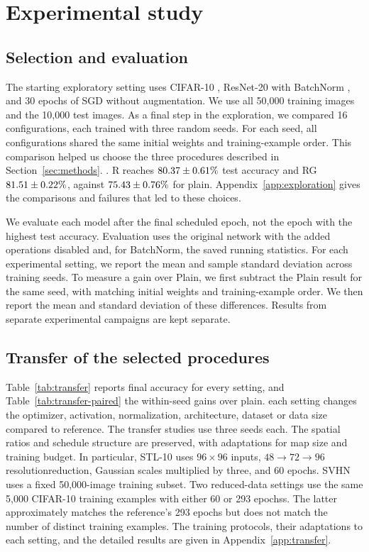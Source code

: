 \section{Experimental study}
\label{sec:experiments}
\subsection{Selection and evaluation}
The starting exploratory setting uses CIFAR-10 \citep{krizhevsky2009learning}, ResNet-20 \citep{he2016resnet} with BatchNorm \citep{ioffe2015batch}, and 30 epochs of SGD without augmentation. We use all 50,000 training images and the 10,000 test images. As a final step in the exploration, we compared 16 configurations, each trained with three random seeds. For each seed, all configurations shared the same initial weights and training-example order. This comparison helped us choose the three procedures described in Section~\ref{sec:methods}.
. R reaches $80.37\pm0.61\%$ test accuracy and RG $81.51\pm0.22\%$, against $75.43\pm0.76\%$ for plain. Appendix~\ref{app:exploration} gives the comparisons and failures that led to these choices.

We evaluate each model after the final scheduled epoch, not the epoch with the highest test accuracy. Evaluation uses the original network with the added operations disabled and, for BatchNorm, the saved running statistics. For each experimental setting, we report the mean and sample standard deviation across training seeds. To measure a gain over Plain, we first subtract the Plain result for the same seed, with matching initial weights and training-example order. We then report the mean and standard deviation of these differences. Results from separate experimental campaigns are kept separate.


\subsection{Transfer of the selected procedures}

Table~\ref{tab:transfer} reports final accuracy for every setting, and Table~\ref{tab:transfer-paired} the within-seed gains over plain. each setting changes the optimizer, activation, normalization, architecture, dataset or data size compared to reference. The transfer studies use three seeds each. The spatial ratios and schedule structure are preserved, with adaptations for map size and training budget. In particular, STL-10 \citep{coates2011analysis} uses $96\times96$ inputs, $48\to72\to96$ resolutionreduction, Gaussian scales multiplied by three, and 60 epochs. SVHN \citep{netzer2011reading} uses a fixed 50,000-image training subset. Two reduced-data settings use the same 5,000 CIFAR-10 training examples with either 60 or 293 epochss. The latter approximately matches the reference's 293 epochs but does not match the number of distinct training examples. The training protocols, their adaptations to each setting, and the detailed results are given in Appendix~\ref{app:transfer}.

